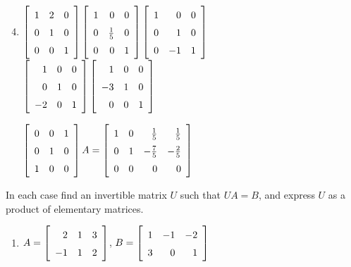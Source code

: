 \begin{multicols}{2}
\begin{ex}
\begin{sol}
\begin{enumerate}[label={\alph*.}]
\setcounter{enumi}{3}
\item $\leftB \begin{array}{rrr}
1 & 2 & 0 \\
0 & 1 & 0 \\
0 & 0 & 1
\end{array} \rightB \leftB \begin{array}{rrr}
1 & 0 & 0 \\
0 & \frac{1}{5} & 0 \\
0 & 0 & 1
\end{array} \rightB \leftB \begin{array}{rrr}
1 & 0 & 0 \\
0 & 1 & 0 \\
0 & -1 & 1
\end{array} \rightB$ \\ $\leftB \begin{array}{rrr}
1 & 0 & 0 \\
0 & 1 & 0 \\
-2 & 0 & 1
\end{array} \rightB \leftB \begin{array}{rrr}
1 & 0 & 0 \\
-3 & 1 & 0 \\
0 & 0 & 1
\end{array} \rightB$

$\leftB \begin{array}{rrr}
0 & 0 & 1 \\
0 & 1 & 0 \\
1 & 0 & 0
\end{array} \rightB A = \leftB \def\arraystretch{1.5}\begin{array}{rrrr}
1 & 0 & \frac{1}{5} & \frac{1}{5} \\
0 & 1 & -\frac{7}{5} & -\frac{2}{5} \\
0 & 0 & 0 & 0
\end{array} \rightB$
\end{enumerate}
\end{sol}
\end{ex}

\begin{ex}
In each case find an invertible matrix $U$ such that $UA = B$, and express $U$ as a product of elementary matrices.
\begin{enumerate}[label={\alph*.}]
\item $A = \leftB \begin{array}{rrr}
2 & 1 & 3 \\
-1 & 1 & 2
\end{array} \rightB$, 
$B = \leftB \begin{array}{rrr}
1 & -1 & -2 \\
3 & 0 & 1
\end{array} \rightB$


\end{enumerate}
\end{ex}
\end{multicols}

